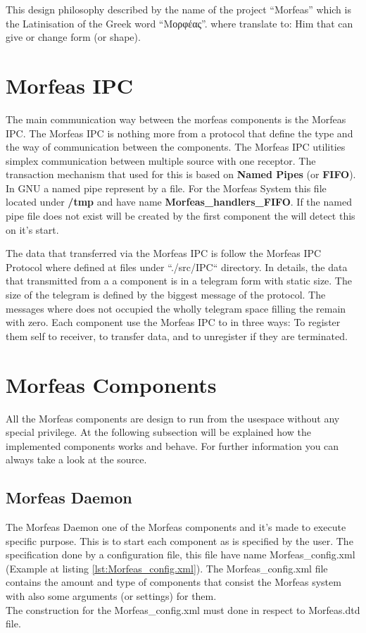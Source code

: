 \documentclass{article}
\begin{document}
This design philosophy described by the name of the project ``Morfeas'' which is the Latinisation of the Greek word
``Μορφέας''. where translate to: Him that can give or change form (or shape).

\section{Morfeas IPC}
The main communication way between the morfeas components is the Morfeas IPC. The Morfeas IPC is nothing more from a protocol that define the type and
the way of communication between the components. The Morfeas IPC utilities simplex communication between multiple source with one receptor.
The transaction mechanism that used for this is based on \textbf{Named Pipes} (or \textbf{FIFO}). In GNU a named pipe represent by a file.
For the Morfeas System this file located under \textbf{/tmp} and have name \textbf{Morfeas\_handlers\_FIFO}.
If the named pipe file does not exist will be created by the first component the will detect this on it's start.

The data that transferred via the Morfeas IPC is follow the Morfeas IPC Protocol where defined at files under ``./src/IPC`` directory.
In details, the data that transmitted from a a component is in a telegram form with static size.
The size of the telegram is defined by the biggest message of the protocol. The messages where does not occupied the wholly telegram space filling the remain with zero.
Each component use the Morfeas IPC to in three ways: To register them self to receiver, to transfer data, and to unregister if they are terminated.

\section{Morfeas Components}
All the Morfeas components are design to run from the usespace without any special privilege.
At the following subsection will be explained how the implemented components works and behave. For further information you can always take a look at the source.

\subsection{Morfeas Daemon}
The Morfeas Daemon one of the Morfeas components and it's made to execute specific purpose. This is to start each component as is specified by the user.
The specification done by a configuration file, this file have name Morfeas\_config.xml (Example at listing \ref{lst:Morfeas_config.xml}).
The Morfeas\_config.xml file contains the amount and type of components that consist the Morfeas system with also some arguments (or settings) for them.\\
The construction for the Morfeas\_config.xml must done in respect to Morfeas.dtd file.
\end{document}
